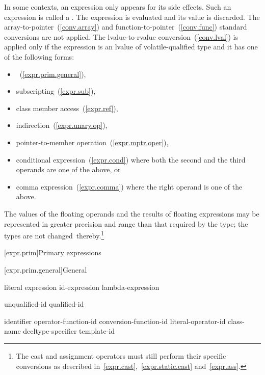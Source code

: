 \pnum
In some contexts, an expression only appears for its side effects. Such an
expression is called a . The expression is
evaluated and its value is discarded. The array-to-pointer~(\ref{conv.array})
and function-to-pointer~(\ref{conv.func}) standard conversions are not
applied. The lvalue-to-rvalue conversion~(\ref{conv.lval}) is applied only if
the expression is an lvalue of volatile-qualified type and it has one of the
following forms:

\begin{itemize}
\item {}~(\ref{expr.prim.general}),
\item subscripting~(\ref{expr.sub}),
\item class member access~(\ref{expr.ref}),
\item indirection~(\ref{expr.unary.op}),
\item pointer-to-member operation~(\ref{expr.mptr.oper}),
\item conditional expression~(\ref{expr.cond}) where both the second and the
      third operands are one of the above, or
\item comma expression~(\ref{expr.comma}) where the right operand is one of
      the above.
\end{itemize}

\pnum
The values of the floating operands and the results of floating
expressions may be represented in greater precision and range than that
required by the type; the types are not changed\
thereby.\footnote{The cast and assignment operators must still perform their specific
conversions as described in~\ref{expr.cast},~\ref{expr.static.cast}
and~\ref{expr.ass}.}

[expr.prim]{Primary expressions}%

[expr.prim.general]{General}

\begin{bnf}
\br
    literal\br
    \br
    \terminal{(} expression \terminal{)}\br
    id-expression\br
    lambda-expression
\end{bnf}

\begin{bnf}
\br
    unqualified-id\br
    qualified-id
\end{bnf}

\begin{bnf}
\br
    identifier\br
    operator-function-id\br
    conversion-function-id\br
    literal-operator-id\br
    \terminal{\tilde} class-name\br
    \terminal{\tilde} decltype-specifier\br
    template-id
\end{bnf}

